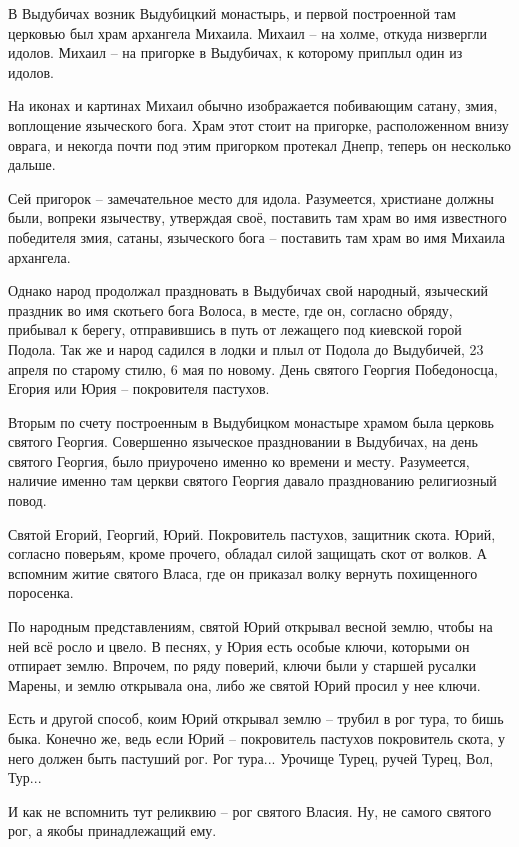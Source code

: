    В Выдубичах возник Выдубицкий монастырь, и первой построенной там церковью был храм архангела Михаила. Михаил – на холме, откуда низвергли идолов. Михаил – на пригорке в Выдубичах, к которому приплыл один из идолов.

   На иконах и картинах Михаил обычно изображается побивающим сатану, змия, воплощение языческого бога. Храм этот стоит на пригорке, расположенном внизу оврага, и некогда почти под этим пригорком протекал Днепр, теперь он несколько дальше.

   Сей пригорок – замечательное место для идола. Разумеется, христиане должны были, вопреки язычеству, утверждая своё, поставить там храм во имя известного победителя змия, сатаны, языческого бога – поставить там храм во имя Михаила архангела.

    Однако народ продолжал праздновать в Выдубичах свой народный, языческий праздник  во имя скотьего бога Волоса, в месте, где он, согласно обряду, прибывал к берегу, отправившись в путь от лежащего под киевской горой Подола. Так же и народ садился в лодки и плыл от Подола до Выдубичей, 23 апреля по старому стилю, 6 мая по новому. День святого Георгия Победоносца, Егория или Юрия – покровителя пастухов. 

   Вторым по счету построенным в Выдубицком монастыре храмом была церковь святого Георгия. Совершенно языческое праздновании в Выдубичах, на день святого Георгия, было приурочено именно ко времени и месту. Разумеется, наличие именно там церкви святого Георгия давало празднованию религиозный повод.

   Святой Егорий, Георгий, Юрий.  Покровитель пастухов, защитник скота. Юрий, согласно поверьям, кроме прочего, обладал силой защищать скот от волков. А вспомним житие святого Власа, где он приказал волку вернуть похищенного поросенка.

   По народным представлениям, святой Юрий открывал весной землю, чтобы на ней всё росло и цвело. В песнях, у Юрия есть особые ключи, которыми он отпирает землю. Впрочем, по ряду поверий, ключи были у старшей русалки Марены, и землю открывала она, либо же святой Юрий просил у нее ключи.

   Есть и другой способ, коим Юрий открывал землю – трубил в рог тура, то бишь быка. Конечно же, ведь если Юрий – покровитель пастухов покровитель скота, у него должен быть пастуший рог. Рог тура... Урочище Турец, ручей Турец, Вол, Тур...

   И как не вспомнить тут реликвию – рог святого Власия. Ну, не самого святого рог, а якобы принадлежащий ему.

